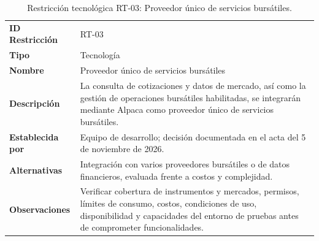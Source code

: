 \documentclass[11pt,a4paper,oneside]{article}
\begin{document}
\begingroup
\small
\setlength{\tabcolsep}{7pt}
\renewcommand{\arraystretch}{1.30}
\setlength{\anchoRegistro}{\dimexpr\textwidth-4\tabcolsep-3\arrayrulewidth\relax}
\begin{table}[H]
\centering
\caption{Restricción tecnológica RT-03: Proveedor único de servicios bursátiles.}
\label{tab:restriccion-rt-03}
\begin{tabular}{|
>{\RaggedRight\arraybackslash}p{.28\anchoRegistro}|
>{\RaggedRight\arraybackslash}p{.72\anchoRegistro}|}
\hline
\rowcolor{negroTabla}
\multicolumn{2}{|l|}{\color{white}\bfseries Registro de Restricción Tecnológica}\\\hline
\cellcolor{azulTabla}\bfseries ID Restricción
& RT-03\\\hline
\cellcolor{azulTabla}\bfseries Tipo
& Tecnología\\\hline
\cellcolor{azulTabla}\bfseries Nombre
& Proveedor único de servicios bursátiles\\\hline
\cellcolor{azulTabla}\bfseries Descripción
& La consulta de cotizaciones y datos de mercado, así como la gestión de operaciones bursátiles habilitadas, se integrarán mediante Alpaca como proveedor único de servicios bursátiles.\\\hline
\cellcolor{azulTabla}\bfseries Establecida por
& Equipo de desarrollo; decisión documentada en el acta del 5 de noviembre de 2026.\\\hline
\cellcolor{azulTabla}\bfseries Alternativas
& Integración con varios proveedores bursátiles o de datos financieros, evaluada frente a costos y complejidad.\\\hline
\cellcolor{azulTabla}\bfseries Observaciones
& Verificar cobertura de instrumentos y mercados, permisos, límites de consumo, costos, condiciones de uso, disponibilidad y capacidades del entorno de pruebas antes de comprometer funcionalidades.\\\hline
\end{tabular}
\end{table}
\endgroup
\end{document}
